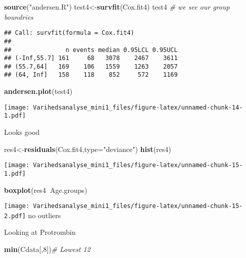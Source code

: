 \documentclass[
]{article}
\newenvironment{Shaded}{\begin{snugshade}}{\end{snugshade}}
\newcommand{\CommentTok}[1]{\textcolor[rgb]{0.56,0.35,0.01}{\textit{#1}}}
\newcommand{\DataTypeTok}[1]{\textcolor[rgb]{0.13,0.29,0.53}{#1}}
\newcommand{\DecValTok}[1]{\textcolor[rgb]{0.00,0.00,0.81}{#1}}
\newcommand{\KeywordTok}[1]{\textcolor[rgb]{0.13,0.29,0.53}{\textbf{#1}}}
\newcommand{\NormalTok}[1]{#1}
\newcommand{\OperatorTok}[1]{\textcolor[rgb]{0.81,0.36,0.00}{\textbf{#1}}}
\newcommand{\StringTok}[1]{\textcolor[rgb]{0.31,0.60,0.02}{#1}}
\begin{document}
\begin{Shaded}
\begin{Highlighting}[]
\KeywordTok{source}\NormalTok{(}\StringTok{"andersen.R"}\NormalTok{)}
\NormalTok{test4<-}\KeywordTok{survfit}\NormalTok{(Cox.fit4)}
\NormalTok{test4 }\CommentTok{# we see our group boundries}
\end{Highlighting}
\end{Shaded}

\begin{verbatim}
## Call: survfit(formula = Cox.fit4)
## 
##               n events median 0.95LCL 0.95UCL
## (-Inf,55.7] 161     68   3078    2467    3611
## (55.7,64]   169    106   1559    1263    2057
## (64, Inf]   158    118    852     572    1169
\end{verbatim}

\begin{Shaded}
\begin{Highlighting}[]
\KeywordTok{andersen.plot}\NormalTok{(test4)}
\end{Highlighting}
\end{Shaded}

\texttt{[image: Varihedsanalyse\_mini1\_files/figure-latex/unnamed-chunk-14-1.pdf]}

Looks good

\begin{Shaded}
\begin{Highlighting}[]
\NormalTok{res4<-}\KeywordTok{residuals}\NormalTok{(Cox.fit4,}\DataTypeTok{type=}\StringTok{"deviance"}\NormalTok{)}
\KeywordTok{hist}\NormalTok{(res4)}
\end{Highlighting}
\end{Shaded}

\texttt{[image: Varihedsanalyse\_mini1\_files/figure-latex/unnamed-chunk-15-1.pdf]}

\begin{Shaded}
\begin{Highlighting}[]
\KeywordTok{boxplot}\NormalTok{(res4}\OperatorTok{~}\NormalTok{Age.groups)}
\end{Highlighting}
\end{Shaded}

\texttt{[image: Varihedsanalyse\_mini1\_files/figure-latex/unnamed-chunk-15-2.pdf]}
no outliers

Looking at Protrombin

\begin{Shaded}
\begin{Highlighting}[]
\KeywordTok{min}\NormalTok{(Cdata[,}\DecValTok{8}\NormalTok{])}\CommentTok{# Lowest 12}
\end{Highlighting}
\end{Shaded}
\end{document}
